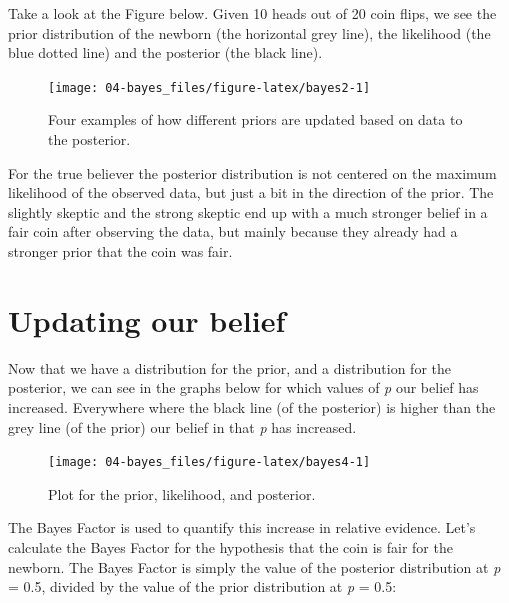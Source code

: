\documentclass[
  oneside]{krantz}
\begin{document}
Take a look at the Figure below. Given 10 heads out of 20 coin flips, we see the prior distribution of the newborn (the horizontal grey line), the likelihood (the blue dotted line) and the posterior (the black line).



\begin{figure}

{\centering \texttt{[image: 04-bayes\_files/figure-latex/bayes2-1]} 

}

\caption{Four examples of how different priors are updated based on data to the posterior.}\label{fig:bayes2}
\end{figure}

For the true believer the posterior distribution is not centered on the maximum likelihood of the observed data, but just a bit in the direction of the prior. The slightly skeptic and the strong skeptic end up with a much stronger belief in a fair coin after observing the data, but mainly because they already had a stronger prior that the coin was fair.

\hypertarget{updating-our-belief}{%
\section{Updating our belief}\label{updating-our-belief}}

Now that we have a distribution for the prior, and a distribution for the posterior, we can see in the graphs below for which values of \emph{p} our belief has increased. Everywhere where the black line (of the posterior) is higher than the grey line (of the prior) our belief in that \emph{p} has increased.



\begin{figure}

{\centering \texttt{[image: 04-bayes\_files/figure-latex/bayes4-1]} 

}

\caption{Plot for the prior, likelihood, and posterior.}\label{fig:bayes4}
\end{figure}

The Bayes Factor is used to quantify this increase in relative evidence. Let's calculate the Bayes Factor for the hypothesis that the coin is fair for the newborn. The Bayes Factor is simply the value of the posterior distribution at \emph{p} = 0.5, divided by the value of the prior distribution at \emph{p} = 0.5:
\end{document}
